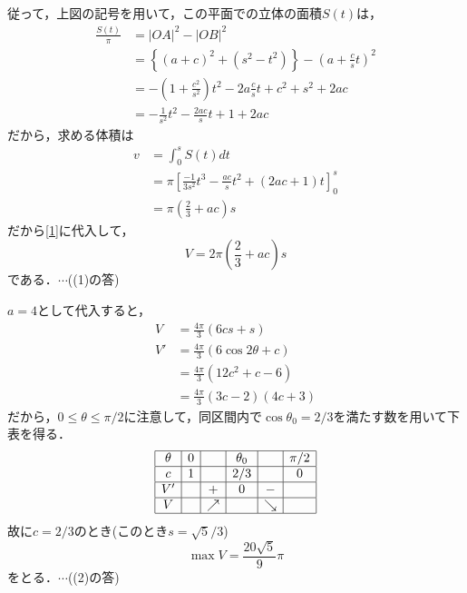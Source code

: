 \documentclass[a4j]{jarticle}
\begin{document}
\begin{multicols}{2}
従って，上図の記号を用いて，この平面での立体の面積$S(t)$は，
     \begin{align*}
     \frac{S(t)}{\pi}&=|OA|^2-|OB|^2 \\
     &=\left\{(a+c)^2+(s^2-t^2)\right\}-\left(a+\frac{c}{s}t\right)^2 \\
     &=-\left(1+\frac{c^2}{s^2}\right)t^2-2a\frac{c}{s}t+c^2+s^2+2ac \\
     &=-\frac{1}{s^2}t^2-\frac{2ac}{s}t+1+2ac
     \end{align*}
だから，求める体積は
     \begin{align*}
     v&=\int_0^sS(t)dt \\
     &=\pi\left[\frac{-1}{3s^2}t^3-\frac{ac}{s}t^2+(2ac+1)t\right]_0^s \\
     &=\pi\left(\frac{2}{3}+ac\right)s
    \end{align*}          
だから\eqref{1}に代入して，
     \[V=2\pi\left(\frac{2}{3}+ac\right)s\]     
である．$\cdots$((1)の答)

$a=4$として代入すると，
      \begin{align*}
      V&=\frac{4\pi}{3}(6cs+s) \\
      V'&=\frac{4\pi}{3}(6\cos2\theta+c) \\
      &=\frac{4\pi}{3}(12c^2+c-6) \\
      &=\frac{4\pi}{3}(3c-2)(4c+3)
      \end{align*}
だから，$0\le\theta\le\pi/2$に注意して，同区間内で$\cos\theta_0=2/3$を満たす数を用いて下表を得る．
     \begin{align*}
          \begin{array}{|c|c|c|c|c|c|} \hline
          \theta&0  &    &\theta_0&   &\pi/2 \\\hline
          c       & 1 &    &  2/3      &     &    0  \\\hline
          V'     &    & +  &    0       &-   &         \\\hline
          V      &    &\nearrow&            &\searrow&        \\\hline
          \end{array}
     \end{align*}      
故に$c=2/3$のとき(このとき$s=\sqrt{5}/3$)
     \[\max V=\frac{20\sqrt{5}}{9}\pi\]
をとる．$\cdots$((2)の答)
\newpage
\end{multicols}
\end{document}
